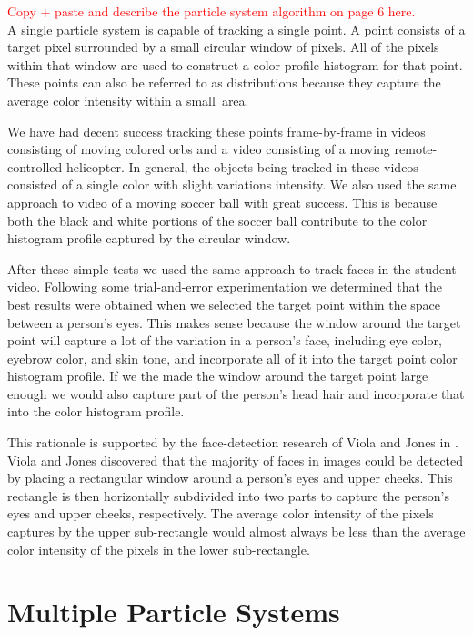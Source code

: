 \documentclass[11pt]{article}
\begin{document}
\textcolor{red}{Copy + paste and describe the particle system algorithm on page 6 here.} \\


A single particle system is capable of tracking a single point. A point consists of a target pixel surrounded by a small circular window of pixels. All of the pixels within that window are used to construct a color profile histogram for that point. These points can also be referred to as distributions because they capture the average color intensity within a small~area.

We have had decent success tracking these points frame-by-frame in videos consisting of moving colored orbs and a video consisting of a moving remote-controlled helicopter. In general, the objects being tracked in these videos consisted of a single color with slight variations intensity. We also used the same approach to video of a moving soccer ball with great success. This is because both the black and white portions of the soccer ball contribute to the color histogram profile captured by the circular window.

After these simple tests we used the same approach to track faces in the student video. Following some trial-and-error experimentation we determined that the best results were obtained when we selected the target point within the space between a person's eyes. This makes sense because the window around the target point will capture a lot of the variation in a person's face, including eye color, eyebrow color, and skin tone, and incorporate all of it into the target point color histogram profile. If we the made the window around the target point large enough we would also capture part of the person's head hair and incorporate that into the color histogram profile. 

This rationale is supported by the face-detection research of Viola and Jones in \cite{facedetection}. Viola and Jones discovered that the majority of faces in images could be detected by placing a rectangular window around a person's eyes and upper cheeks. This rectangle is then horizontally subdivided into two parts to capture the person's eyes and upper cheeks, respectively. The average color intensity of the pixels captures by the upper sub-rectangle would almost always be less than the average color intensity of the pixels in the lower sub-rectangle.  



\section{Multiple Particle Systems}
\label{sec:multparticlesys}
\end{document}
